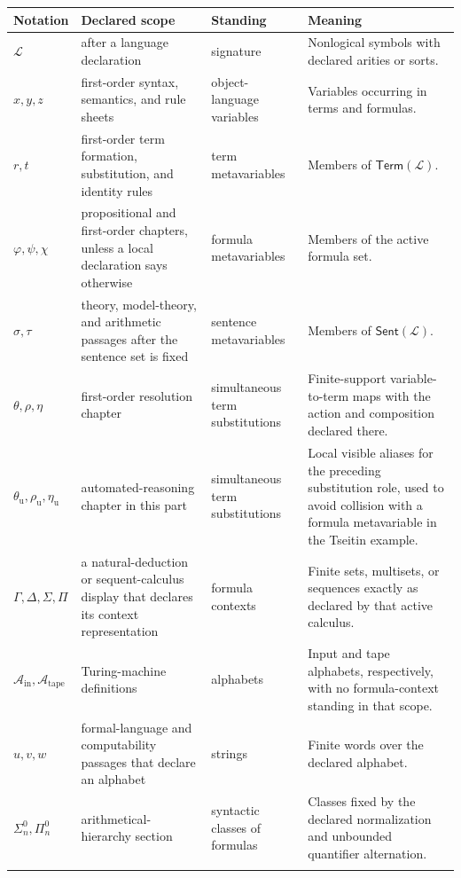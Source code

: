 \documentclass[11pt,oneside,openany]{book}
\theoremstyle{definition}
\theoremstyle{plain}
\theoremstyle{remark}
\newcommand{\Lang}{\mathcal{L}}
\newcommand{\Term}{\mathsf{Term}}
\newcommand{\Sent}{\mathsf{Sent}}
\begin{document}
\begin{longtable}{@{}p{}p{}p{}p{}@{}}
\toprule
Notation & Declared scope & Standing & Meaning \\
\midrule
\endhead
\(\Lang\) & after a language declaration & signature & Nonlogical symbols with
declared arities or sorts. \\
\(x,y,z\) & first-order syntax, semantics, and rule sheets & object-language
variables & Variables occurring in terms and formulas. \\
\(r,t\) & first-order term formation, substitution, and identity rules & term
metavariables & Members of \(\Term(\Lang)\). \\
\(\varphi,\psi,\chi\) & propositional and first-order chapters, unless a local
declaration says otherwise & formula metavariables & Members of the active
formula set. \\
\(\sigma,\tau\) & theory, model-theory, and arithmetic passages after the
sentence set is fixed & sentence metavariables & Members of
\(\Sent(\Lang)\). \\
\(\theta,\rho,\eta\) & first-order resolution chapter & simultaneous term
substitutions & Finite-support variable-to-term maps with the action and
composition declared there. \\
\(\theta_{\mathrm u},\rho_{\mathrm u},\eta_{\mathrm u}\) & automated-reasoning
chapter in this part & simultaneous term substitutions & Local visible aliases
for the preceding substitution role, used to avoid collision with a formula
metavariable in the Tseitin example. \\
\(\Gamma,\Delta,\Sigma,\Pi\) & a natural-deduction or sequent-calculus display
that declares its context representation & formula contexts & Finite sets,
multisets, or sequences exactly as declared by that active calculus. \\
\(\mathcal A_{\mathrm{in}},\mathcal A_{\mathrm{tape}}\) & Turing-machine
definitions & alphabets & Input and tape alphabets, respectively, with no
formula-context standing in that scope. \\
\(u,v,w\) & formal-language and computability passages that declare an
alphabet & strings & Finite words over the declared alphabet. \\
\(\Sigma^0_n,\Pi^0_n\) & arithmetical-hierarchy section & syntactic classes
of formulas & Classes fixed by the declared normalization and unbounded
quantifier alternation. \\
\(\boldsymbol{\Sigma}^0_n,\boldsymbol{\Pi}^0_n,

\end{longtable}
\end{document}

